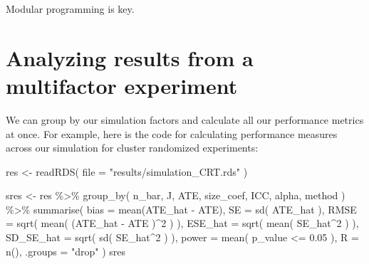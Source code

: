 \documentclass[
]{book}
\newenvironment{Shaded}{\begin{snugshade}}{\end{snugshade}}
\newcommand{\AttributeTok}[1]{\textcolor[rgb]{0.77,0.63,0.00}{#1}}
\newcommand{\DecValTok}[1]{\textcolor[rgb]{0.00,0.00,0.81}{#1}}
\newcommand{\FloatTok}[1]{\textcolor[rgb]{0.00,0.00,0.81}{#1}}
\newcommand{\FunctionTok}[1]{\textcolor[rgb]{0.00,0.00,0.00}{#1}}
\newcommand{\NormalTok}[1]{#1}
\newcommand{\OtherTok}[1]{\textcolor[rgb]{0.56,0.35,0.01}{#1}}
\newcommand{\SpecialCharTok}[1]{\textcolor[rgb]{0.00,0.00,0.00}{#1}}
\newcommand{\StringTok}[1]{\textcolor[rgb]{0.31,0.60,0.02}{#1}}
\begin{document}
Modular programming is key.

\hypertarget{analyzing-results-from-a-multifactor-experiment}{%
\section{Analyzing results from a multifactor experiment}\label{analyzing-results-from-a-multifactor-experiment}}

We can group by our simulation factors and calculate all our performance metrics at once.
For example, here is the code for calculating performance measures across our simulation for cluster randomized experiments:

\begin{Shaded}
\begin{Highlighting}[]
\NormalTok{res }\OtherTok{\textless{}{-}} \FunctionTok{readRDS}\NormalTok{( }\AttributeTok{file =} \StringTok{"results/simulation\_CRT.rds"}\NormalTok{ )}

\NormalTok{sres }\OtherTok{\textless{}{-}} 
\NormalTok{  res }\SpecialCharTok{\%\textgreater{}\%} 
  \FunctionTok{group\_by}\NormalTok{( n\_bar, J, ATE, size\_coef, ICC, alpha, method ) }\SpecialCharTok{\%\textgreater{}\%}
  \FunctionTok{summarise}\NormalTok{( }
    \AttributeTok{bias =} \FunctionTok{mean}\NormalTok{(ATE\_hat }\SpecialCharTok{{-}}\NormalTok{ ATE),}
    \AttributeTok{SE =} \FunctionTok{sd}\NormalTok{( ATE\_hat ),}
    \AttributeTok{RMSE =} \FunctionTok{sqrt}\NormalTok{( }\FunctionTok{mean}\NormalTok{( (ATE\_hat }\SpecialCharTok{{-}}\NormalTok{ ATE )}\SpecialCharTok{\^{}}\DecValTok{2}\NormalTok{ ) ),}
    \AttributeTok{ESE\_hat =} \FunctionTok{sqrt}\NormalTok{( }\FunctionTok{mean}\NormalTok{( SE\_hat}\SpecialCharTok{\^{}}\DecValTok{2}\NormalTok{ ) ),}
    \AttributeTok{SD\_SE\_hat =} \FunctionTok{sqrt}\NormalTok{( }\FunctionTok{sd}\NormalTok{( SE\_hat}\SpecialCharTok{\^{}}\DecValTok{2}\NormalTok{ ) ),}
    \AttributeTok{power =} \FunctionTok{mean}\NormalTok{( p\_value }\SpecialCharTok{\textless{}=} \FloatTok{0.05}\NormalTok{ ),}
    \AttributeTok{R =} \FunctionTok{n}\NormalTok{(),}
    \AttributeTok{.groups =} \StringTok{"drop"}
\NormalTok{  )}
\NormalTok{sres}
\end{Highlighting}
\end{Shaded}
\end{document}
